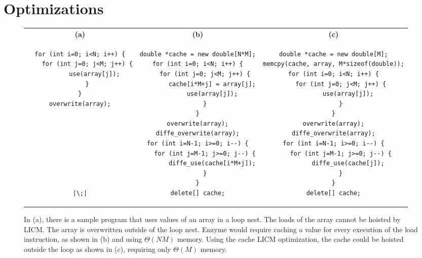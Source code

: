 
\section{Optimizations}
\label{sec:opt}


\begin{figure*}
    \centering
 \begin{tabular}{c|c|c}
\textbf{(a)}&\textbf{(b)}&\textbf{(c)}\\
\begin{minipage}[T]{0.26\linewidth}
\begin{verbatim}
for (int i=0; i<N; i++) {
    for (int j=0; j<M; j++) {
        use(array[j]);
    }
}
overwrite(array);








|\;|
\end{verbatim}
\end{minipage}& \begin{minipage}[T]{0.34\linewidth}
\begin{verbatim}
double *cache = new double[N*M];
for (int i=0; i<N; i++) {
    for (int j=0; j<M; j++) {
        cache[i*M+j] = array[j];
        use(array[j]);
    }
}
overwrite(array);
diffe_overwrite(array);
for (int i=N-1; i>=0; i--) {
    for (int j=M-1; j>=0; j--) {
        diffe_use(cache[i*M+j]);
    }
}
delete[] cache;
\end{verbatim}
\end{minipage}& \begin{minipage}[T]{0.34\linewidth}
\begin{verbatim}
double *cache = new double[M];
memcpy(cache, array, M*sizeof(double));
for (int i=0; i<N; i++) {
    for (int j=0; j<M; j++) {
        use(array[j]);
    }
}
overwrite(array);
diffe_overwrite(array);
for (int i=N-1; i>=0; i--) {
    for (int j=M-1; j>=0; j--) {
        diffe_use(cache[j]);
    }
}
delete[] cache;
\end{verbatim}
\end{minipage}
\end{tabular}
    \caption{In (a), there is a sample program that uses values of an array in a loop nest. The loads of the array cannot be hoisted by LICM. The array is overwritten outside of the loop nest. Enzyme would require caching a value for every execution of the load instruction, as shown in (b) and using $\Theta(NM)$ memory. Using the cache LICM optimization, the cache could be hoisted outside the loop as shown in (c), requiring only $\Theta(M)$ memory.}
    \label{fig:cache_licm}
\end{figure*}

